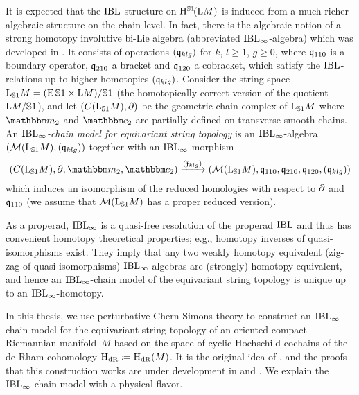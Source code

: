 \documentclass[\MainFolder/Text.tex]{subfiles}
\begin{document}
It is expected that the $\mathrm{IBL}$-structure on $\bar{\mathrm{H}}^{\mathbb{S}{1}}\!(\mathrm{L} M)$ is induced from a much richer algebraic structure on the chain level. In fact, there is the algebraic notion of a strong homotopy involutive bi-Lie algebra (abbreviated $\mathrm{IBL}_\infty$-algebra) which was developed in \cite{Cieliebak2015}. It consists of operations $(\mathfrak{q}_{klg})$ for $k$, $l \ge 1$, $g\ge 0$, where $\mathfrak{q}_{110}$ is a boundary operator, $\mathfrak{q}_{210}$ a bracket and $\mathfrak{q}_{120}$ a cobracket, which satisfy the $\mathrm{IBL}$-relations up to higher homotopies $(\mathfrak{q}_{klg})$. Consider the string space $\mathrm{L}_{\mathbb{S}{1}} M = (\operatorname{E}\mathbb{S}{1}\times \mathrm{L} M)/\mathbb{S}{1}$ (the homotopically correct version of the quotient $\mathrm{L} M/\mathbb{S}{1}$), and let $(C(\mathrm{L}_{\mathbb{S}{1}} M),\partial)$ be the geometric chain complex of $\mathrm{L}_{\mathbb{S}{1}} M$ where~$\StringOp_2$ and $\StringCoOp_2$ are partially defined on transverse smooth chains. An \emph{$\mathrm{IBL}_\infty$-chain model for equivariant string topology} is an $\mathrm{IBL}_\infty$-algebra $(\mathcal{M}(\mathrm{L}_{\mathbb{S}{1}} M),(\mathfrak{q}_{klg}))$ together with an $\mathrm{IBL}_\infty$-morphism
$$ (C(\StringSpace M),\Bdd,\StringOp_2,\StringCoOp_2) \xrightarrow{(\HTP_{klg})} (\Model(\StringSpace M),\OPQ_{110},\OPQ_{210},\OPQ_{120},(\OPQ_{klg})) $$
which induces an isomorphism of the reduced homologies with respect to $\partial$ and $\mathfrak{q}_{110}$ (we assume that $\mathcal{M}(\mathrm{L}_{\mathbb{S}{1}} M)$ has a proper reduced version).

As a properad, $\mathrm{IBL}_\infty$ is a quasi-free resolution of the properad $\mathrm{IBL}$ and thus has convenient homotopy theoretical properties; e.g., homotopy inverses of quasi-isomorphisms exist. They imply that any two weakly homotopy equivalent (zig-zag of quasi-isomorphisms) $\mathrm{IBL}_\infty$-algebras are (strongly) homotopy equivalent, and hence an $\mathrm{IBL}_\infty$-chain model of the equivariant string topology is unique up to an $\mathrm{IBL}_\infty$-homotopy.


In this thesis, we use perturbative Chern-Simons theory to construct an $\mathrm{IBL}_\infty$-chain model for the equivariant string topology of an oriented compact Riemannian manifold~$M$ based on the space of cyclic Hochschild cochains of the de Rham cohomology $\mathrm{H}_{\mathrm{dR}}\coloneqq \mathrm{H}_{\mathrm{dR}}(M)$. It is the original idea of \cite{Cieliebak2015}, and the proofs that this construction works are under development in \cite{Cieliebak2018} and \cite{Cieliebak2018b}. We explain the $\mathrm{IBL}_\infty$-chain model with a physical flavor. 
\end{document}

